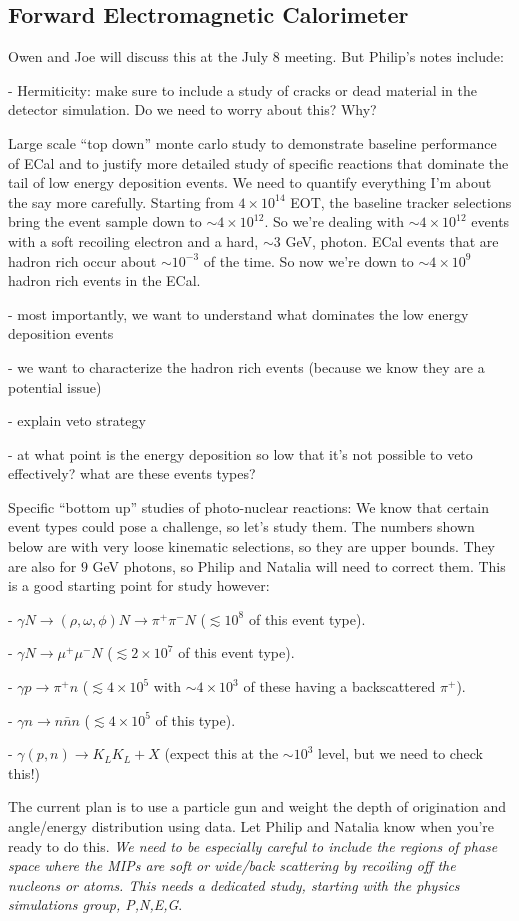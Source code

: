 
\subsection{Forward Electromagnetic Calorimeter}

Owen and Joe will discuss this at the July 8 meeting. But Philip's notes include: 

- Hermiticity:  make sure to include a study of cracks or dead material in the detector simulation. Do we need to worry about this? Why? 

Large scale ``top down'' monte carlo study to demonstrate baseline performance of ECal and to justify more detailed study of specific reactions that dominate the tail of low energy deposition events. We need to quantify everything I'm about the say more carefully. Starting from $4\times 10^{14}$ EOT, the baseline tracker selections bring the event sample down to $\sim 4 \times 10^{12}$. So we're dealing with $\sim 4 \times 10^{12}$ events with a soft recoiling electron and a hard, $\sim 3$ GeV, photon. ECal events that are hadron rich occur about $\sim10^{-3}$ of the time. So now we're down to $\sim 4\times 10^{9}$ hadron rich events in the ECal. 

- most importantly, we want to understand what dominates the low energy deposition events

- we want to characterize the hadron rich events (because we know they are a potential issue)

- explain veto strategy

- at what point is the energy deposition so low that it's not possible to veto effectively? what are these events types? 

Specific ``bottom up'' studies of photo-nuclear reactions:  We know that certain event types could pose a challenge, so let's study them. The numbers shown below are with very loose kinematic selections, so they are upper bounds. They are also for $9$ GeV photons, so Philip and Natalia will need to correct them. This is a good starting point for study however: 

- $\gamma N \rightarrow (\rho,\omega,\phi)N\rightarrow \pi^+\pi^- N$ ($\lesssim 10^8$ of this event type). 

- $\gamma N \rightarrow  \mu^+\mu^- N$ ($\lesssim 2 \times 10^7$ of this event type). 

- $\gamma p \rightarrow \pi^+ n$ ($\lesssim 4\times 10^5$ with $\sim 4\times 10^3$ of these having a backscattered $\pi^+$). 

- $\gamma n \rightarrow n \bar{n} n$ ($\lesssim 4\times 10^5$ of this type). 

- $\gamma (p,n) \rightarrow K_L K_L + X$ (expect this at the $\sim 10^3$ level, but we need to check this!)

The current plan is to use a particle gun and weight the depth of origination and angle/energy distribution using data. Let Philip and Natalia know when you're ready to do this. 
{\it We need to be especially careful to include the regions of phase space where the MIPs are soft or wide/back scattering by recoiling off the nucleons or atoms. This needs a dedicated study, starting with the physics simulations group, P,N,E,G}. 


